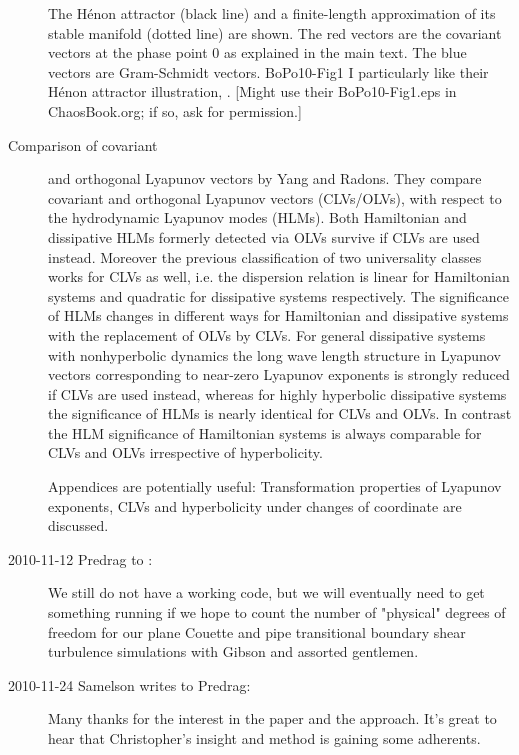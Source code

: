 \begin{description}
%
 {}{
The H\'enon attractor (black line) and a finite-length
approximation of its stable manifold (dotted line) are shown.
The red vectors are the covariant vectors at the phase point
0 as explained in the main text. The blue vectors are
Gram-Schmidt vectors.
}{BoPo10-Fig1}
%
I particularly like their H\'enon attractor illustration,
.
[Might use their BoPo10-Fig1.eps in ChaosBook.org; if so,
ask for permission.]

\item[Comparison of covariant] and orthogonal {Lyapunov
vectors} by Yang and Radons. They compare
covariant and orthogonal Lyapunov vectors (CLVs/OLVs), with
respect to the hydrodynamic Lyapunov modes (HLMs). Both
Hamiltonian and dissipative HLMs formerly detected via OLVs
survive if CLVs are used instead. Moreover the previous
classification of two universality classes works for CLVs as
well, i.e. the dispersion relation is linear for Hamiltonian
systems and quadratic for dissipative systems respectively.
The significance of HLMs changes in different ways for
Hamiltonian and dissipative systems with the replacement of
OLVs by CLVs. For general dissipative systems with
nonhyperbolic dynamics the long wave length structure in
Lyapunov vectors corresponding to near-zero Lyapunov
exponents is strongly reduced if CLVs are used instead,
whereas for highly hyperbolic dissipative systems the
significance of HLMs is nearly identical for CLVs and OLVs.
In contrast the HLM significance of Hamiltonian systems is
always comparable for CLVs and OLVs irrespective of
hyperbolicity.

Appendices are potentially useful: Transformation properties
of Lyapunov exponents, CLVs and hyperbolicity under changes
of coordinate are discussed.

\item[2010-11-12 Predrag to
\HREF{http://www.coas.oregonstate.edu/faculty/samelson.html}{Roger M. Samelson}:]
We still do not have a working code, but we will eventually need to get
something running if we hope to count the number of "physical" degrees of
freedom for our plane Couette and pipe transitional boundary shear
turbulence simulations with Gibson and assorted gentlemen.

\item[2010-11-24 Samelson writes to Predrag:]
Many thanks for the interest in the paper and the
approach.  It's great to hear that Christopher's insight and method is
gaining some adherents.


\end{description}
